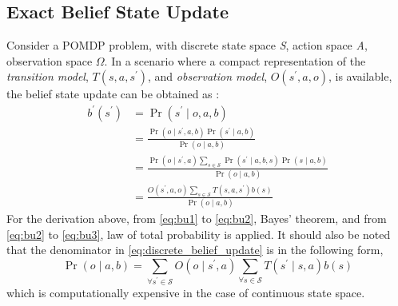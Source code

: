 \subsection{Exact Belief State Update}
\label{sec:exact_update}
Consider a POMDP problem, with discrete state space \textit{S}, action space \textit{A}, observation space $ \Omega $. In a scenario where a compact representation of the \textit{transition model}, $ T(s, a, s^{\prime})$,  and \textit{observation model}, $ O(s^{\prime}, a, o) $, is available, the belief state update can be obtained as \cite{KAELBLING199899}:
\begin{align}
b^{\prime}\left(s^{\prime}\right) &=\operatorname{Pr}\left(s^{\prime} \mid o, a, b\right) \label{eq:bu1}\\
&=\frac{\operatorname{Pr}\left(o \mid s^{\prime}, a, b\right) \operatorname{Pr}\left(s^{\prime} \mid a, b\right)}{\operatorname{Pr}(o \mid a, b)} \label{eq:bu2}\\
&=\frac{\operatorname{Pr}\left(o \mid s^{\prime}, a\right) \sum_{s \in \mathcal{S}} \operatorname{Pr}\left(s^{\prime} \mid a, b, s\right) \operatorname{Pr}(s \mid a, b)}{\operatorname{Pr}(o \mid a, b)}  \label{eq:bu3}\\
&=\frac{O\left(s^{\prime}, a, o\right) \sum_{s \in \mathcal{S}} T\left(s,a, s^{\prime}\right) b(s)}{\operatorname{Pr}(o \mid a, b)} 
\label{eq:discrete_belief_update}
\end{align}
For the derivation above, from \autoref{eq:bu1} to \autoref{eq:bu2}, Bayes' theorem, and from \autoref{eq:bu2} to \autoref{eq:bu3}, law of total probability is applied. It should also be noted that the denominator in \autoref{eq:discrete_belief_update} is in the following form, 
\begin{equation}
\operatorname{Pr}(o \mid a, b) = \sum_{\forall s^{\prime} \in \mathcal{S}} O(o \mid s^{\prime}, a) \sum_{\forall s \in \mathcal{S}} T(s^{\prime}\mid s,a) b(s)
\label{eq:nasty_denom}
\end{equation}
which is computationally expensive in the case of continuous state space.
